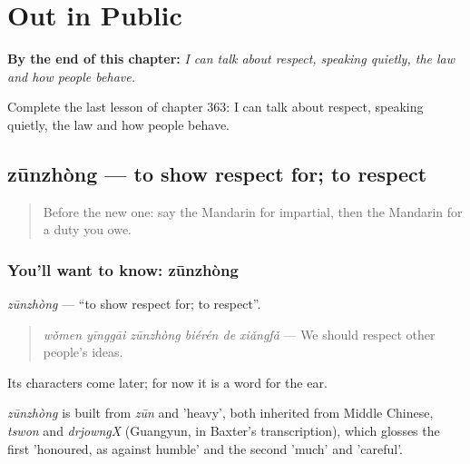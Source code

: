 
\chapter{Out in Public}
\label{ch:zh-out-in-public}

\begin{chapteropening}
\textbf{By the end of this chapter:} \emph{I can talk about respect, speaking quietly, the law and how people behave.}

Complete the last lesson of chapter 363: I can talk about respect, speaking quietly, the law and how people behave.
\end{chapteropening}

\section[zūnzhòng]{zūnzhòng — to show respect for; to respect}

\label{lesson:ZH-C363-zunzhong}



\begin{quote}
Before the new one: say the Mandarin for impartial, then the Mandarin for a duty you owe.
\end{quote}

\subsection*{You'll want to know: zūnzhòng}
\emph{zūnzhòng} — \textquotedblleft{}to show respect for; to respect\textquotedblright{}.

\begin{quote}
\emph{wǒmen yīnggāi zūnzhòng biérén de xiǎngfǎ} — We should respect other people's ideas.
\end{quote}

Its characters come later; for now it is a word for the ear.

\begin{cousinweb}
\emph{zūnzhòng} is built from \emph{zūn} and  'heavy', both inherited from Middle Chinese, \emph{tswon} and \emph{drjowngX} (Guangyun, in Baxter's transcription), which glosses the first 'honoured, as against humble' and the second 'much' and 'careful'.
\end{cousinweb}

